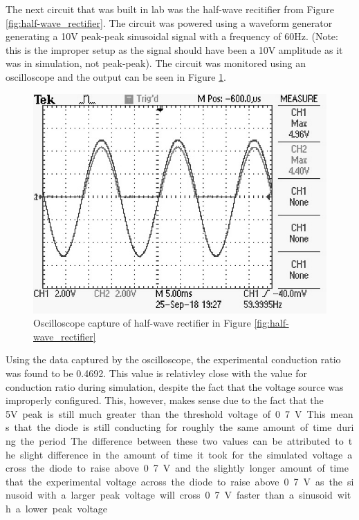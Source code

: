 \documentclass[11pt]{article}
\begin{document}
	\hfill \break

	The next circuit that was built in lab was the half-wave recitifier from 
	Figure \ref{fig:half-wave_rectifier}. The circuit was powered using a 
	waveform generator generating a 10\si{\volt} peak-peak sinusoidal signal with 
	a frequency of 60\si{\hertz}. (Note: this is the improper setup as the 
	signal should have been a 10\si{\volt} amplitude as it was in simulation,
	not peak-peak). The circuit was monitored using an oscilloscope and 
	the output can be seen in Figure \ref{fig:half-wave_rectifier_graph_exp}.

	\begin{figure}[H]
		\centering
		\includegraphics{half_wave_rectifier_graph_exp.JPG}
		\caption{Oscilloscope capture of half-wave rectifier in Figure \ref{fig:half-wave_rectifier}}
		\label{fig:half-wave_rectifier_graph_exp}
	\end{figure}

	Using the data captured by the oscilloscope, the experimental conduction
	ratio was found to be 0.4692. This value is relativley close with the
	value for conduction ratio during simulation, despite the fact that
	the voltage source was improperly configured. This, however, makes sense due to
	the fact that the 5\si\volt peak is still much greater than the threshold
	voltage of 0.7\si\volt. This means that the diode is still conducting for 
	roughly the same amount of time during the period. The difference between 
	these two values can be attributed to the slight difference in the 
	amount of time it took for the simulated voltage across the diode to raise
	above 0.7\si{\volt} and the slightly longer amount of time that the experimental
	voltage across the diode to raise above 0.7\si{\volt} as the sinusoid with a larger
	peak voltage will cross 0.7\si{\volt} faster than a sinusoid with a lower peak
	voltage.\\
\end{document}
